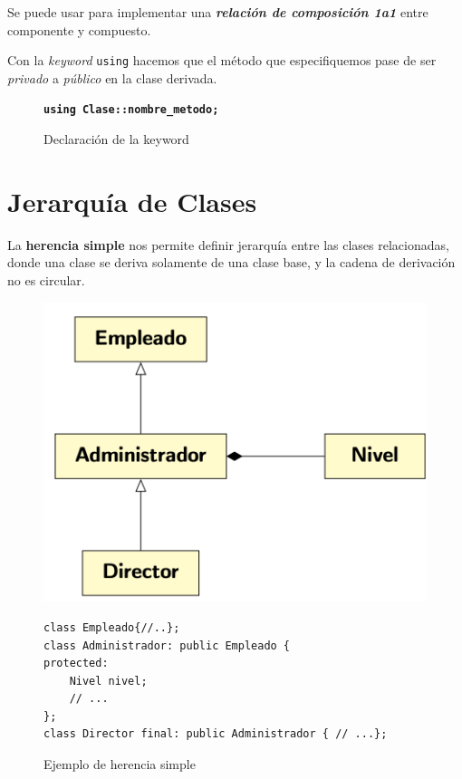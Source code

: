 Se puede usar para implementar una \textbf{\textit{relación de composición 1a1}} entre componente y compuesto.

Con la \textit{keyword} \texttt{using} hacemos que el método que especifiquemos pase de ser \textit{privado} a \textit{público} en la clase derivada.

\begin{figure}[h]
	\centering
	\texttt {\textbf{using Clase::nombre\_metodo;}}
	\caption{Declaración de la keyword}
\end{figure}
\section{Jerarquía de Clases}
La \textbf{herencia simple} nos permite definir jerarquía entre las clases relacionadas, donde una clase se deriva solamente de una clase base, y la cadena de derivación no es circular.


\begin{figure}[h]
	\begin{minipage}[t]{0.4\textwidth}
		\includegraphics[width=\textwidth]{Imagenes/gen6.png}
		\caption{Ejemplo de herencia simple}
	\end{minipage}
	\hfill
	\begin{minipage}[t]{0.55\textwidth}
\vspace{-4.6cm}
		\begin{lstlisting}[frame=single]
class Empleado{//..};
class Administrador: public Empleado {
protected:
	Nivel nivel;
	// ...
};
class Director final: public Administrador { // ...};
		\end{lstlisting}
	\end{minipage}
\end{figure}


